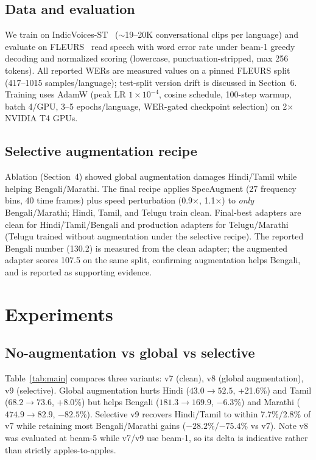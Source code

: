\documentclass[9pt,a4paper,twocolumn]{article}
\begin{document}
\subsection{Data and evaluation}
We train on IndicVoices-ST~\cite{javed2024sravaani} ($\sim$19--20K conversational clips per language) and evaluate on FLEURS~\cite{conneau2022fleurs} read speech with word error rate under beam-1 greedy decoding and normalized scoring (lowercase, punctuation-stripped, max 256 tokens). All reported WERs are measured values on a pinned FLEURS split (417--1015 samples/language); test-split version drift is discussed in Section~6. Training uses AdamW (peak LR $1\times10^{-4}$, cosine schedule, 100-step warmup, batch 4/GPU, 3--5 epochs/language, WER-gated checkpoint selection) on 2$\times$ NVIDIA T4 GPUs.

\subsection{Selective augmentation recipe}
Ablation (Section~4) showed global augmentation damages Hindi/Tamil while helping Bengali/Marathi. The final recipe applies SpecAugment (27 frequency bins, 40 time frames) plus speed perturbation (0.9$\times$, 1.1$\times$) to \textit{only} Bengali/Marathi; Hindi, Tamil, and Telugu train clean. Final-best adapters are clean for Hindi/Tamil/Bengali and production adapters for Telugu/Marathi (Telugu trained without augmentation under the selective recipe). The reported Bengali number (130.2) is measured from the clean adapter; the augmented adapter scores 107.5 on the same split, confirming augmentation helps Bengali, and is reported as supporting evidence.

\section{Experiments}
\subsection{No-augmentation vs global vs selective}
Table~\ref{tab:main} compares three variants: v7 (clean), v8 (global augmentation), v9 (selective). Global augmentation hurts Hindi ($43.0\to52.5$, +21.6\%) and Tamil ($68.2\to73.6$, +8.0\%) but helps Bengali ($181.3\to169.9$, $-6.3\%$) and Marathi ($474.9\to82.9$, $-82.5\%$). Selective v9 recovers Hindi/Tamil to within 7.7\%/2.8\% of v7 while retaining most Bengali/Marathi gains ($-28.2\%$/$-75.4\%$ vs v7). Note v8 was evaluated at beam-5 while v7/v9 use beam-1, so its delta is indicative rather than strictly apples-to-apples.
\end{document}

